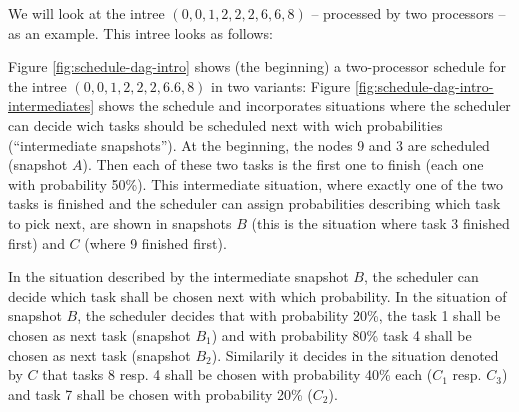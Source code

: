 We will look at the intree $(0,0,1,2,2,2,6,6,8)$ -- processed by two processors -- as an example. This intree looks as follows:

\begin{center}
\end{center}

Figure \ref{fig:schedule-dag-intro} shows (the beginning) a two-processor schedule for the intree $(0,0,1,2,2,2,6.6,8)$ in two variants: Figure \ref{fig:schedule-dag-intro-intermediates} shows the schedule and incorporates situations where the scheduler can decide wich tasks should be scheduled next with wich probabilities (``intermediate snapshots''). At the beginning, the nodes 9 and 3 are scheduled (snapshot $A$). Then each of these two tasks is the first one to finish (each one with probability 50\%). This intermediate situation, where exactly one of the two tasks is finished and the scheduler can assign probabilities describing which task to pick next, are shown in snapshots $B$ (this is the situation where task 3 finished first) and $C$ (where 9 finished first).

In the situation described by the intermediate snapshot $B$, the scheduler can decide which task shall be chosen next with which probability. In the situation of snapshot $B$, the scheduler decides that with probability 20\%, the task 1 shall be chosen as next task (snapshot $B_1$) and with probability 80\% task 4 shall be chosen as next task (snapshot $B_2$). Similarily it decides in the situation denoted by $C$ that tasks 8 resp. 4 shall be chosen with probability 40\% each ($C_1$ resp. $C_3$) and task 7 shall be chosen with probability 20\% ($C_2$).

